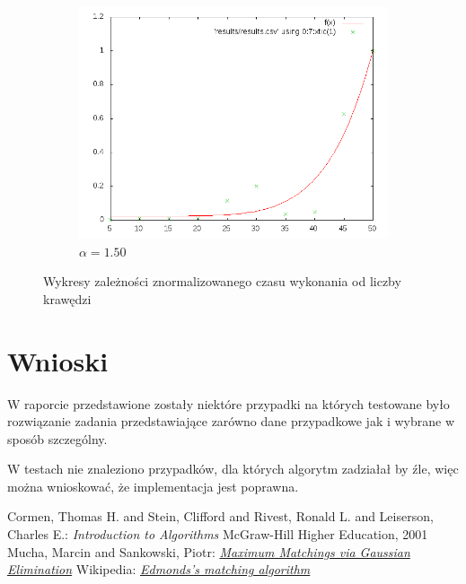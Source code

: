 \documentclass{llncs}
\begin{document}
\begin{figure}
\begin{subfigure}
  \caption{$\alpha=1.00$}
  \label{fig:sub2}
\end{subfigure}
%
\begin{subfigure}
  \centering
  \includegraphics[width=.4\linewidth]{img/150.png}
  \caption{$\alpha=1.50$}
  \label{fig:sub2}
\end{subfigure}
\caption{Wykresy zależności znormalizowanego czasu wykonania od liczby krawędzi}
\label{fig:complexity}
\end{figure}

\section{Wnioski}
W raporcie przedstawione zostały niektóre przypadki na których testowane było rozwiązanie zadania przedstawiające zarówno dane przypadkowe jak i wybrane w sposób szczególny.

W testach nie znaleziono przypadków, dla których algorytm zadziałał by źle, więc można wnioskować, że implementacja jest poprawna.

%
\begin{thebibliography}{4}
%
Cormen, Thomas H. and Stein, Clifford and Rivest, Ronald L. and Leiserson, Charles E.:
\textsl{Introduction to Algorithms}
McGraw-Hill Higher Education, 2001
Mucha, Marcin and Sankowski, Piotr:
\textsl{\href{http://www.mimuw.edu.pl/~mucha/pub/mucha_sankowski_focs04.pdf}{Maximum Matchings via Gaussian Elimination}}
Wikipedia:
\textsl{\href{http://en.wikipedia.org/wiki/Blossom_algorithm}{Edmonds's matching algorithm}}
\end{thebibliography}
\end{document}
